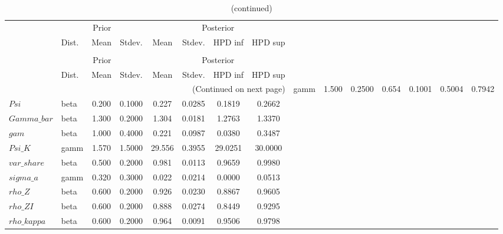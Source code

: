  
\begin{center}
\begin{longtable}{llcccccc} 
\caption{Results from Metropolis-Hastings (parameters)}
 \label{Table:MHPosterior:1}\\
\toprule 
  & \multicolumn{3}{c}{Prior}  &  \multicolumn{4}{c}{Posterior} \\
  \cmidrule(r{.75em}){2-4} \cmidrule(r{.75em}){5-8}
  & Dist. & Mean  & Stdev. & Mean & Stdev. & HPD inf & HPD sup\\
\midrule \endfirsthead 
\caption{(continued)}\\\toprule 
  & \multicolumn{3}{c}{Prior}  &  \multicolumn{4}{c}{Posterior} \\
  \cmidrule(r{.75em}){2-4} \cmidrule(r{.75em}){5-8}
  & Dist. & Mean  & Stdev. & Mean & Stdev. & HPD inf & HPD sup\\
\midrule \endhead 
\bottomrule \multicolumn{8}{r}{(Continued on next page)} \endfoot 
\bottomrule \endlastfoot 
$sigma$ & gamm &   1.500 & 0.2500 &   0.654& 0.1001 &  0.5004 &  0.7942 \\ 
$Psi$ & beta &   0.200 & 0.1000 &   0.227& 0.0285 &  0.1819 &  0.2662 \\ 
$Gamma\_bar$ & beta &   1.300 & 0.2000 &   1.304& 0.0181 &  1.2763 &  1.3370 \\ 
$gam$ & beta &   1.000 & 0.4000 &   0.221& 0.0987 &  0.0380 &  0.3487 \\ 
$Psi\_K$ & gamm &   1.570 & 1.5000 &  29.556& 0.3955 & 29.0251 & 30.0000 \\ 
$var\_share$ & beta &   0.500 & 0.2000 &   0.981& 0.0113 &  0.9659 &  0.9980 \\ 
$sigma\_a$ & gamm &   0.320 & 0.3000 &   0.022& 0.0214 &  0.0000 &  0.0513 \\ 
$rho\_Z$ & beta &   0.600 & 0.2000 &   0.926& 0.0230 &  0.8867 &  0.9605 \\ 
$rho\_ZI$ & beta &   0.600 & 0.2000 &   0.888& 0.0274 &  0.8449 &  0.9295 \\ 
$rho\_kappa$ & beta &   0.600 & 0.2000 &   0.964& 0.0091 &  0.9506 &  0.9798 \\ 
\end{longtable}
 \end{center}
